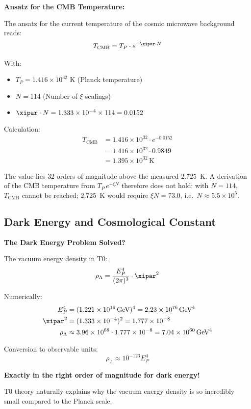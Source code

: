 	\begin{application}
		\textbf{Ansatz for the CMB Temperature:}

		The ansatz for the current temperature of the cosmic microwave background reads:
		\begin{equation}
			T_{\text{CMB}} = T_P \cdot e^{-\xipar \cdot N}
		\end{equation}
		
		With:
		\begin{itemize}
			\item $T_P = 1.416 \times 10^{32}$ K (Planck temperature)
			\item $N = 114$ (Number of $\xi$-scalings)
			\item $\xipar \cdot N = 1.333 \times 10^{-4} \times 114 = 0.0152$
		\end{itemize}
		
		Calculation:
		\begin{align}
			T_{\text{CMB}} &= 1.416 \times 10^{32} \cdot e^{-0.0152} \\
			&= 1.416 \times 10^{32} \cdot 0.9849 \\
			&= 1.395 \times 10^{32}\, \text{K}
		\end{align}
		
		The value lies $32$ orders of magnitude above the measured $2.725$~K. A derivation of the CMB temperature from $T_P\,e^{-\xi N}$ therefore does not hold: with $N = 114$, $T_{\text{CMB}}$ cannot be reached; $2.725$~K would require $\xi N = 73.0$, i.e.\ $N \approx 5.5\times10^{5}$.
	\end{application}
	
	\subsection{Dark Energy and Cosmological Constant}
	
	\begin{insight}
		\textbf{The Dark Energy Problem Solved?}
		
		The vacuum energy density in T0:
		\begin{equation}
			\rho_{\Lambda} = \frac{E_P^4}{(2\pi)^3} \cdot \xipar^2
		\end{equation}
		
		Numerically:
		\begin{align}
			E_P^4 &= (1.221 \times 10^{19}\, \text{GeV})^4 = 2.23 \times 10^{76}\, \text{GeV}^4 \\
			\xipar^2 &= (1.333 \times 10^{-4})^2 = 1.777 \times 10^{-8} \\
			\rho_{\Lambda} &\approx 3.96 \times 10^{68} \cdot 1.777 \times 10^{-8} = 7.04 \times 10^{60}\, \text{GeV}^4
		\end{align}
		
		Conversion to observable units:
		\begin{equation}
			\rho_{\Lambda} \approx 10^{-123} E_P^4
		\end{equation}
		
		\textbf{Exactly in the right order of magnitude for dark energy!}
		
		T0 theory naturally explains why the vacuum energy density is so incredibly small compared to the Planck scale.
	\end{insight}
	
